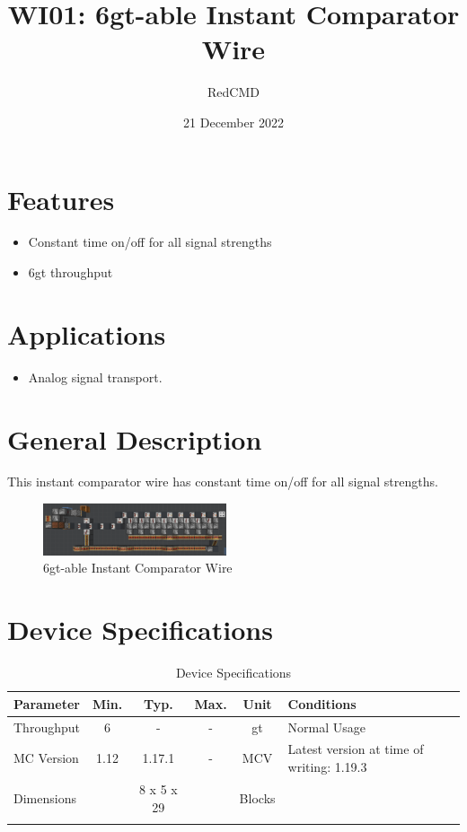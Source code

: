 \documentclass[10pt]{datasheet}
\title{WI01: 6gt-able Instant Comparator Wire}
\author{RedCMD}
\date{21 December 2022}
\begin{document}
\maketitle

\section{Features}

\begin{itemize}
\item{Constant time on/off for all signal strengths}
\item{6gt throughput}
\end{itemize}

\section{Applications}

\begin{itemize}
\item{Analog signal transport.}
\end{itemize}

\section{General Description}
This instant comparator wire has constant time on/off for all signal strengths.
\vfill\break

\begin{figure}[h]
    \centering
    \includegraphics[width=0.48\textwidth]{redcmd.png}
    \caption{\centering 6gt-able Instant Comparator Wire}
\end{figure}

\onecolumn

\section{Device Specifications}

\begin{table}[h]
    \caption{Device Specifications}
    \begin{tabularx}{\textwidth}{l | c c c | c | X}
        \thickhline
        \textbf{Parameter} & \textbf{Min.} & \textbf{Typ.} & \textbf{Max.} &
        \textbf{Unit} & \textbf{Conditions} \\
        \hline
        Throughput  & 6 & - & - & gt & Normal Usage \\
        \hline
        MC Version & 1.12 & 1.17.1 & - & MCV & Latest version at time of writing: 1.19.3\\
        \hline
        Dimensions & & 8 x 5 x 29 & & Blocks & \\
        \thickhline
\end{tabularx}
\end{table}
\end{document}
